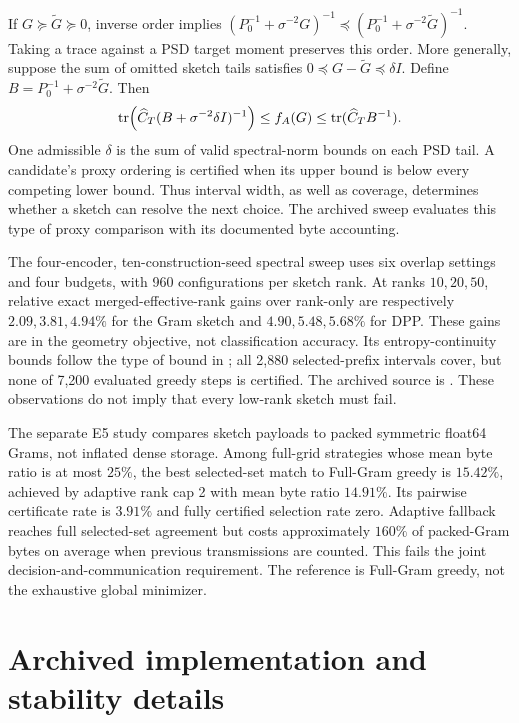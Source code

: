 \documentclass{article}
\begin{document}
If $G\succeq\widetilde G\succeq0$, inverse order implies $(P_0^{-1}+\sigma^{-2}G)^{-1}\preceq(P_0^{-1}+\sigma^{-2}\widetilde G)^{-1}$. Taking a trace against a PSD target moment preserves this order. More generally, suppose the sum of omitted sketch tails satisfies $0\preceq G-\widetilde G\preceq\delta I$. Define $B=P_0^{-1}+\sigma^{-2}\widetilde G$. Then
\begin{equation}
 \operatorname{tr}\!\left(\widehat C_T(B+\sigma^{-2}\delta I)^{-1}\right)
 \leq f_A(G)\leq\operatorname{tr}(\widehat C_TB^{-1}).
 \label{eq:interval}
\end{equation}
One admissible $\delta$ is the sum of valid spectral-norm bounds on each PSD tail. A candidate's proxy ordering is certified when its upper bound is below every competing lower bound. Thus interval width, as well as coverage, determines whether a sketch can resolve the next choice. The archived sweep evaluates this type of proxy comparison with its documented byte accounting.

The four-encoder, ten-construction-seed spectral sweep uses six overlap settings and four budgets, with 960 configurations per sketch rank. At ranks $10,20,50$, relative exact merged-effective-rank gains over rank-only are respectively $2.09,3.81,4.94\%$ for the Gram sketch and $4.90,5.48,5.68\%$ for DPP. These gains are in the geometry objective, not classification accuracy. Its entropy-continuity bounds follow the type of bound in \citet{audenaert2007}; all 2,880 selected-prefix intervals cover, but none of 7,200 evaluated greedy steps is certified. The archived source is . These observations do not imply that every low-rank sketch must fail.

The separate E5 study compares sketch payloads to packed symmetric float64 Grams, not inflated dense storage. Among full-grid strategies whose mean byte ratio is at most $25\%$, the best selected-set match to Full-Gram greedy is $15.42\%$, achieved by adaptive rank cap 2 with mean byte ratio $14.91\%$. Its pairwise certificate rate is $3.91\%$ and fully certified selection rate zero. Adaptive fallback reaches full selected-set agreement but costs approximately $160\%$ of packed-Gram bytes on average when previous transmissions are counted. This fails the joint decision-and-communication requirement. The reference is Full-Gram greedy, not the exhaustive global minimizer.

\section{Archived implementation and stability details}
\end{document}
